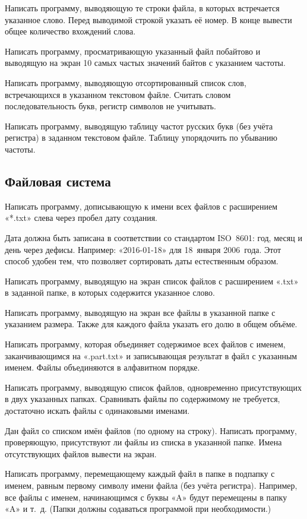 \task Написать программу, выводяющую те строки файла, в которых
встречается указанное слово. Перед выводимой строкой указать её
номер. В конце вывести общее количество вхождений слова.

\task Написать программу, просматривающую указанный файл побайтово и
выводящую на экран 10 самых частых значений байтов с указанием
частоты.

\task Написать программу, выводяющую отсортированный список слов,
встречающихся в указанном текстовом файле. Считать словом
последовательность букв, регистр символов не учитывать.

\task Написать программу, выводящую таблицу частот русских букв (без
учёта регистра) в заданном текстовом файле. Таблицу упорядочить по
убыванию частоты.


\subsection{Файловая система}

\task Написать программу, дописывающую к имени всех файлов с
расширением «*.txt» слева через пробел дату создания.

Дата должна быть записана в соответствии со стандартом ISO~8601: год,
месяц и день через дефисы. Например: «2016-01-18» для 18~января
2006~года. Этот способ удобен тем, что позволяет сортировать даты
естественным образом.

\task Написать программу, выводящую на экран список файлов с
расширением «.txt» в заданной папке, в которых содержится указанное
слово.

\task Написать программу, выводящую на экран все файлы в указанной
папке с указанием размера. Также для каждого файла указать его долю в
общем объёме.

\task Написать программу, которая объединяет содержимое всех файлов с
именем, заканчивающимся на «.part.txt» и записывающая результат в файл
с указанным именем. Файлы объединяются в алфавитном порядке.

\task Написать программу, выводящую список файлов, одновременно
присутствующих в двух указанных папках. Сравнивать файлы по
содержимому не требуется, достаточно искать файлы с одинаковыми
именами.

\task Дан файл со списком имён файлов (по одному на строку). Написать
программу, проверяющую, присутствуют ли файлы из списка в указанной
папке. Имена отсутствующих файлов вывести на экран.

\task Написать программу, перемещающему каждый файл в папке в подпапку
с именем, равным первому символу имени файла (без учёта
регистра). Например, все файлы с именем, начинающимся с буквы «A»
будут перемещены в папку «A» и т.~д. (Папки должны содаваться
программой при необходимости.)

